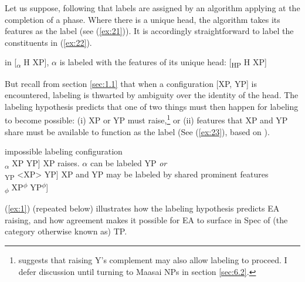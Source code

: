 \documentclass[output=paper
,modfonts
,nonflat]{langsci/langscibook}
\begin{document}
Let us suppose, following \citet{Chomsky2013, Chomsky2015} that labels are assigned by an algorithm applying at the completion of a phase. Where there is a unique head, the algorithm takes its features as the label (see (\ref{ex:21})). It is accordingly straightforward to label the constituents in (\ref{ex:22}).

\begin{exe}
\ex\label{ex:21} in [\textsubscript{$\alpha$} H XP], $\alpha$ is labeled with the features of its unique head: [\textsubscript{HP} H XP] 
\end{exe}
\begin{exe}
	\ex\label{ex:22} \oneline{{\lbrack}\textsubscript{$\alpha$} buy [\textsubscript{$\beta$} a [\textsubscript{$\gamma$} \textit{n} book]]]      \textit{is labeled} {\lbrack}\textsubscript{VP} buy [\textsubscript{DP} a [\textsubscript{nP} \textit{n} book]]{\rbrack}}
\end{exe}
But recall from section \ref{sec:1.1} that when a configuration [XP, YP] is encountered, labeling is thwarted by ambiguity over the identity of the head. The labeling hypothesis predicts that one of two things must then happen for labeling to become possible: (i) XP or YP must raise,\footnote{\citet{Chomsky2015} suggests that raising Y’s complement may also allow labeling to proceed. I defer discussion until turning to Maasai NPs in section \ref{sec:6.2}.}  or (ii) features that XP and YP share must be available to function as the label (See  (\ref{ex:23}), based on \citealt[44]{Chomsky2013}).

\begin{exe}
	\ex \label{ex:23}
	\xlist
	\ex impossible labeling configuration\\
	{\lbrack}\textsubscript{$\alpha$} XP YP] 
	\ex XP raises. ${\alpha}$ can be labeled YP  \textit{or}\\
	{\lbrack}\textsubscript{YP} <XP> YP] 
	\ex XP and YP may be labeled by shared prominent features\\
	{\lbrack}\textsubscript{$\phi$} XP\textsuperscript{$\phi$} YP\textsuperscript{$\phi$}] 
	\endxlist
\end{exe}
(\ref{ex:1}) (repeated below) illustrates how the labeling hypothesis predicts EA raising, and how agreement makes it possible for EA to surface in Spec of (the category otherwise known as) TP.
\end{document}
